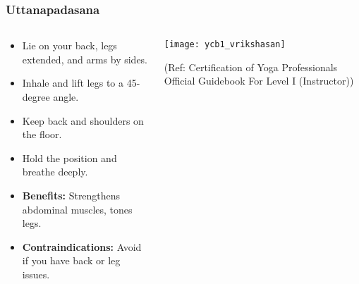 \begin{frame}[fragile]\frametitle{Uttanapadasana}
\begin{columns}
    \begin{column}[T]{0.5\linewidth}
      \begin{itemize}
        \item Lie on your back, legs extended, and arms by sides.
        \item Inhale and lift legs to a 45-degree angle.
        \item Keep back and shoulders on the floor.
        \item Hold the position and breathe deeply.
        \item \textbf{Benefits:} Strengthens abdominal muscles, tones legs.
        \item \textbf{Contraindications:} Avoid if you have back or leg issues.
      \end{itemize}
    \end{column}
    \begin{column}[T]{0.5\linewidth}
        \begin{center}
        \begin{center}
		        \texttt{[image: ycb1\_vrikshasan]}
				
				{\tiny (Ref: Certification  of Yoga Professionals Official Guidebook For Level I (Instructor))}	        
		\end{center}   
        \end{center}    
    \end{column}
  \end{columns}
\end{frame}


